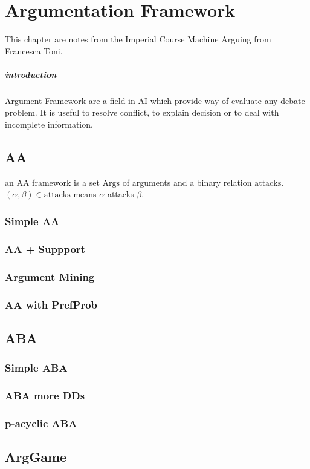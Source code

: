\chapter{Argumentation Framework} %
\label{cha:argumentation_framework}

This chapter are notes from the Imperial Course Machine Arguing from Francesca Toni. 

\paragraph{introduction} %
\label{par:introduction}

Argument Framework are a field in AI which provide way of evaluate any debate problem. It is useful to resolve conflict, to explain decision or to deal with incomplete information. 
\section{AA}

\begin{definition}
 		an AA framework is a set $\mathrm{Args}$ of arguments and a binary relation $\mathrm{attacks}$. $(\alpha, \beta)\in \mathrm{attacks}$ means $\alpha$ attacks $\beta$.
\end{definition} 

\subsection{Simple AA}
\subsection{AA + Suppport}
\subsection{Argument Mining}
\subsection{AA with PrefProb}
\section{ABA}
\subsection{Simple ABA}

\subsection{ABA more DDs}
\subsection{p-acyclic ABA}
\section{ArgGame}
